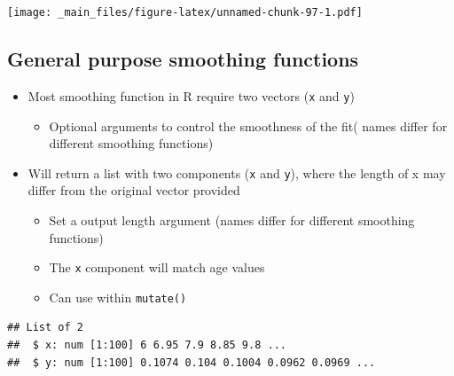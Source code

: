 \documentclass[
]{book}
\newenvironment{Shaded}{\begin{snugshade}}{\end{snugshade}}
\newcommand{\AttributeTok}[1]{\textcolor[rgb]{0.77,0.63,0.00}{#1}}
\newcommand{\FunctionTok}[1]{\textcolor[rgb]{0.00,0.00,0.00}{#1}}
\newcommand{\NormalTok}[1]{#1}
\newcommand{\OtherTok}[1]{\textcolor[rgb]{0.56,0.35,0.01}{#1}}
\newcommand{\SpecialCharTok}[1]{\textcolor[rgb]{0.00,0.00,0.00}{#1}}
\providecommand{\tightlist}{%
  \setlength{\itemsep}{0pt}\setlength{\parskip}{0pt}}
\begin{document}
\texttt{[image: \_main\_files/figure-latex/unnamed-chunk-97-1.pdf]}

\hypertarget{general-purpose-smoothing-functions-3}{%
\subsection{General purpose smoothing functions}\label{general-purpose-smoothing-functions-3}}

\begin{itemize}
\tightlist
\item
  Most smoothing function in R require two vectors (\texttt{x} and \texttt{y})

  \begin{itemize}
  \tightlist
  \item
    Optional arguments to control the smoothness of the fit( names differ for different smoothing functions)
  \end{itemize}
\item
  Will return a list with two components (\texttt{x} and \texttt{y}), where the length of x may differ from the original vector provided

  \begin{itemize}
  \tightlist
  \item
    Set a output length argument (names differ for different smoothing functions)
  \item
    The \texttt{x} component will match age values
  \item
    Can use within \texttt{mutate()}
  \end{itemize}
\end{itemize}

\begin{Shaded}
\end{Shaded}

\begin{verbatim}
## List of 2
##  $ x: num [1:100] 6 6.95 7.9 8.85 9.8 ...
##  $ y: num [1:100] 0.1074 0.104 0.1004 0.0962 0.0969 ...
\end{verbatim}

\begin{Shaded}
\end{Shaded}
\end{document}
